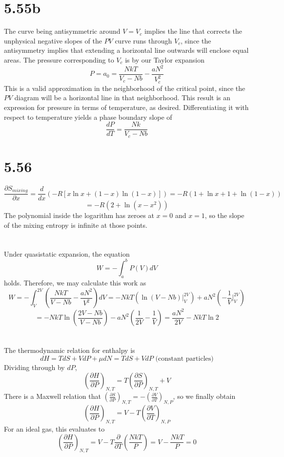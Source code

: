 \documentclass{article}
\begin{document}
\section*{5.55b}
The curve being antisymmetric around $V=V_{c}$ implies the line that corrects the unphysical negative slopes of the $PV$ curve runs through $V_{c}$, since the antisymmetry implies that extending a horizontal line outwards will enclose equal areas. The pressure corresponding to $V_{c}$ is by our Taylor expansion
\[P=a_{0}=\frac{NkT}{V_{c}-Nb}-\frac{aN^{2}}{V_{c}^{2}}\]
This is a valid approximation in the neighborhood of the critical point, since the $PV$ diagram will be a horizontal line in that neighborhood.
This result is an expression for pressure in terms of temperature, as desired.
Differentiating it with respect to temperature yields a phase boundary slope of
\[\frac{dP}{dT}=\frac{Nk}{V_{c}-Nb}\]

\section*{5.56}
\[\frac{\partial S_{mixing}}{\partial x}=\frac{d}{dx}\left( -R\left[ x\ln x+(1-x)\ln(1-x) \right] \right)=-R\left( 1+\ln x+1+\ln(1-x) \right)\]
\[=-R(2+\ln(x-x^{2}))\]
The polynomial inside the logarithm has zeroes at $x=0$ and $x=1$, so the slope of the mixing entropy is infinite at those points.

\section{}
Under quasistatic expansion, the equation
\[W=-\int_{a}^{b}P(V)dV\]
holds. Therefore, we may calculate this work as
\[W=-\int_{V}^{2V}\left( \frac{NkT}{V-Nb}-\frac{aN^{2}}{V^{2}} \right)dV=-NkT\left( \ln(V-Nb)\bigg|_{V}^{2V} \right)+aN^{2}\left(-\frac{1}{V}\bigg|_{V}^{2V}  \right)\]
\[=-NkT\ln\left( \frac{2V-Nb}{V-Nb} \right)-aN^{2}\left(\frac{1}{2V}-\frac{1}{V} \right)=\frac{aN^{2}}{2V}-NkT\ln2\]

\section{}
The thermodynamic relation for enthalpy is
\[dH=TdS+VdP+\mu dN=TdS+ VdP\textrm{ (constant particles)}\]
Dividing through by $dP$,
\[\left( \frac{\partial H}{\partial P} \right)_{N,T}=T\left( \frac{\partial S}{\partial P} \right)_{N,T}+V\]
There is a Maxwell relation that $\left( \frac{\partial S}{\partial P} \right)_{N,T}=-\left( \frac{\partial V}{\partial T} \right)_{N,P}$, so we finally obtain
\[\left( \frac{\partial H}{\partial P} \right)_{N,T}=V-T\left( \frac{\partial V}{\partial T} \right)_{N,P}\]
For an ideal gas, this evaluates to
\[\left( \frac{\partial H}{\partial P} \right)_{N,T}=V-T\frac{\partial}{\partial T}\left( \frac{NkT}{P} \right)=V-\frac{NkT}{P}=0\]
\end{document}
